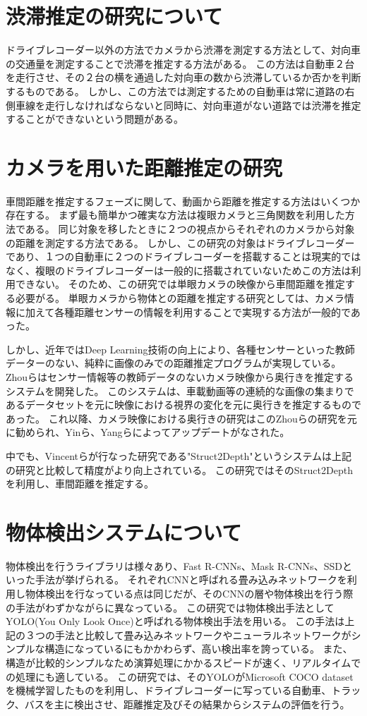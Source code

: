 \section{渋滞推定の研究について}
ドライブレコーダー以外の方法でカメラから渋滞を測定する方法として、対向車の交通量を測定することで渋滞を推定する方法がある。
この方法は自動車２台を走行させ、その２台の横を通過した対向車の数から渋滞しているか否かを判断するものである。
しかし、この方法では測定するための自動車は常に道路の右側車線を走行しなければならないと同時に、対向車道がない道路では渋滞を推定することができないという問題がある。

\section{カメラを用いた距離推定の研究}
車間距離を推定するフェーズに関して、動画から距離を推定する方法はいくつか存在する。
まず最も簡単かつ確実な方法は複眼カメラと三角関数を利用した方法である。
同じ対象を移したときに２つの視点からそれぞれのカメラから対象の距離を測定する方法である。
しかし、この研究の対象はドライブレコーダーであり、１つの自動車に２つのドライブレコーダーを搭載することは現実的ではなく、複眼のドライブレコーダーは一般的に搭載されていないためこの方法は利用できない。
そのため、この研究では単眼カメラの映像から車間距離を推定する必要がる。
単眼カメラから物体との距離を推定する研究としては、カメラ情報に加えて各種距離センサーの情報を利用することで実現する方法が一般的であった。

しかし、近年ではDeep Learning技術の向上により、各種センサーといった教師データーのない、純粋に画像のみでの距離推定プログラムが実現している。
Zhouらはセンサー情報等の教師データのないカメラ映像から奥行きを推定するシステムを開発した。
このシステムは、車載動画等の連続的な画像の集まりであるデータセットを元に映像における視界の変化を元に奥行きを推定するものであった。
これ以降、カメラ映像における奥行きの研究はこのZhouらの研究を元に勧められ、Yinら、Yangらによってアップデートがなされた。

中でも、Vincentらが行なった研究である"Struct2Depth"というシステムは上記の研究と比較して精度がより向上されている。
この研究ではそのStruct2Depthを利用し、車間距離を推定する。

\section{物体検出システムについて}
物体検出を行うライブラリは様々あり、Fast R-CNNs、Mask R-CNNs、SSDといった手法が挙げられる。
それぞれCNNと呼ばれる畳み込みネットワークを利用し物体検出を行なっている点は同じだが、そのCNNの層や物体検出を行う際の手法がわずかながらに異なっている。
この研究では物体検出手法としてYOLO(You Only Look Once)と呼ばれる物体検出手法を用いる。
この手法は上記の３つの手法と比較して畳み込みネットワークやニューラルネットワークがシンプルな構造になっているにもかかわらず、高い検出率を誇っている。
また、構造が比較的シンプルなため演算処理にかかるスピードが速く、リアルタイムでの処理にも適している。
この研究では、そのYOLOがMicrosoft COCO datasetを機械学習したものを利用し、ドライブレコーダーに写っている自動車、トラック、バスを主に検出させ、距離推定及びその結果からシステムの評価を行う。